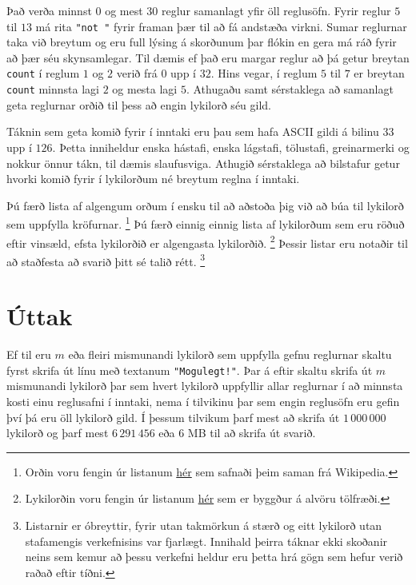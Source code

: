 Það verða minnst $0$ og mest $30$ reglur samanlagt yfir öll reglusöfn.
Fyrir reglur $5$ til $13$ má rita \texttt{"not "} fyrir framan þær til að fá andstæða virkni.
Sumar reglurnar taka við breytum og eru full lýsing á skorðunum þar flókin en gera má ráð fyrir að þær séu skynsamlegar.
Til dæmis ef það eru margar reglur að þá getur breytan \texttt{count} í reglum $1$ og $2$ verið frá $0$ upp í $32$.
Hins vegar, í reglum $5$ til $7$ er breytan \texttt{count} minnsta lagi $2$ og mesta lagi $5$.
Athugaðu samt sérstaklega að samanlagt geta reglurnar orðið til þess að engin lykilorð séu gild.

Táknin sem geta komið fyrir í inntaki eru þau sem hafa ASCII gildi á bilinu $33$ upp í $126$.
Þetta inniheldur enska hástafi, enska lágstafi, tölustafi, greinarmerki og nokkur önnur tákn, til dæmis slaufusviga.
Athugið sérstaklega að bilstafur getur hvorki komið fyrir í lykilorðum né breytum reglna í inntaki.

Þú færð lista af algengum orðum í ensku til að aðstoða þig við að búa til lykilorð sem uppfylla kröfurnar.
\footnote{Orðin voru fengin úr listanum \href{https://github.com/tkoop/popular-english-words/}{hér} sem safnaði þeim saman frá Wikipedia.}
Þú færð einnig einnig lista af lykilorðum sem eru röðuð eftir vinsæld, efsta lykilorðið er algengasta lykilorðið.
\footnote{Lykilorðin voru fengin úr listanum \href{https://github.com/danielmiessler/SecLists/tree/master/Passwords/Common-Credentials}{hér} sem er byggður á alvöru tölfræði.}
Þessir listar eru notaðir til að staðfesta að svarið þitt sé talið rétt.
\footnote{Listarnir er óbreyttir, fyrir utan takmörkun á stærð og eitt lykilorð utan stafamengis verkefnisins var fjarlægt.
Innihald þeirra táknar ekki skoðanir neins sem kemur að þessu verkefni heldur eru þetta hrá gögn sem hefur verið raðað eftir tíðni.}

\section*{Úttak}
Ef til eru $m$ eða fleiri mismunandi lykilorð sem uppfylla gefnu reglurnar skaltu fyrst skrifa út línu með textanum \texttt{"Mogulegt!"}.
Þar á eftir skaltu skrifa út $m$ mismunandi lykilorð þar sem hvert lykilorð uppfyllir allar reglurnar í að minnsta kosti einu reglusafni í inntaki, nema í tilvikinu þar sem engin reglusöfn eru gefin því þá eru öll lykilorð gild.
Í þessum tilvikum þarf mest að skrifa út $1\,000\,000$ lykilorð og þarf mest $6\,291\,456$ eða $6$ MB til að skrifa út svarið.

